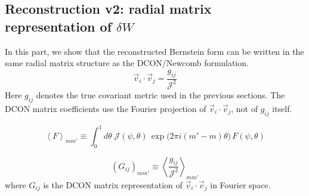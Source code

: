 \documentclass[10pt,a4paper]{article}
\numberwithin{equation}{section}
\begin{document}
\subsection{Reconstruction v2: radial matrix representation of $\delta W$}
In this part, we show that the reconstructed Bernstein form can be written in the same radial matrix structure as the DCON/Newcomb formulation.
\begin{equation}
\boxed{\;\vec v_i\cdot\vec v_j=\frac{g_{ij}}{\mathcal{J}^2}\;}
\end{equation}
Here $g_{ij}$ denotes the true covariant metric used in the previous sections.
The DCON matrix coefficients use the Fourier projection of $\vec v_i\cdot\vec v_j$, not of $g_{ij}$ itself.

\begin{equation}
\boxed{
\left\langle F \right\rangle_{mm'}
\equiv \int_{0}^{1} d\theta\;
\mathcal{J}(\psi,\theta)\,
\exp\!\bigl(2\pi i(m'-m)\theta\bigr)\,
F(\psi,\theta)
}
\end{equation}

\begin{equation}
\boxed{
(G_{ij})_{mm'} \equiv \left\langle \frac{g_{ij}}{\mathcal{J}^2} \right\rangle_{mm'}
}
\end{equation}
where $G_{ij}$ is the DCON matrix representation of $\vec v_i\cdot\vec v_j$ in Fourier space.
\end{document}
